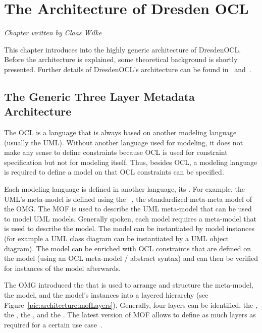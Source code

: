 \chapter{The Architecture of Dresden OCL}
\label{chapter:architecture}

\begin{flushright}
\textit{Chapter written by Claas Wilke}
\end{flushright}

This chapter introduces into the highly generic architecture of DresdenOCL.
Before the architecture is explained, some theoretical background is shortly 
presented. Further details of DresdenOCL's architecture can be found
in~\cite{braeuerEA:OCL2007} and~\cite{wilkeEA:MODELS2010}.



\section{The Generic Three Layer Metadata Architecture}
\label{architecture:genericLayers}

The \acl{OCL} is a language that is always based on another modeling language 
(usually the \acs{UML}). Without another language used for modeling, it does 
not make any sense to define constraints because \acs{OCL} is used for
constraint specification but not for modeling itself. Thus, besides \acs{OCL}, 
a modeling language is required to define a model on that \acs{OCL} constraints 
can be specified.

Each modeling language is defined in another language, its 
. For example, the \acl{UML}'s meta-model is 
defined using the ~\cite{spec:MOF2.0}, the standardized
meta-meta model of the \acs{OMG}. The \acs{MOF} is used to describe the 
\acs{UML} meta-model that can be used to model \acs{UML} models. Generally 
spoken, each model requires a meta-model that is used to describe the model. 
The model can be instantiated by model instances (for example a \acs{UML} class 
diagram can be instantiated by a \acs{UML} object diagram). The model can be 
enriched with \acs{OCL} constraints that are defined on the model (using an 
\acs{OCL} meta-model / abstract syntax) and can then be verified for instances
of the model afterwards.

The \acs{OMG} introduced the  \cite{spec:MOF2.0}\cite[p. 16ff]{spec:UML2-2Inf} that is used to 
arrange and structure the meta-model, the model, and the model's instances into 
a layered hierarchy (see Figure~\ref{pic:architecture:mofLayers}). Generally, 
four layers can be identified, the , the
, the , and the 
. The latest version of \acs{MOF} allows to
define as much layers as required for a certain use
case~\cite[p.~8f]{spec:MOF2.0}. 

